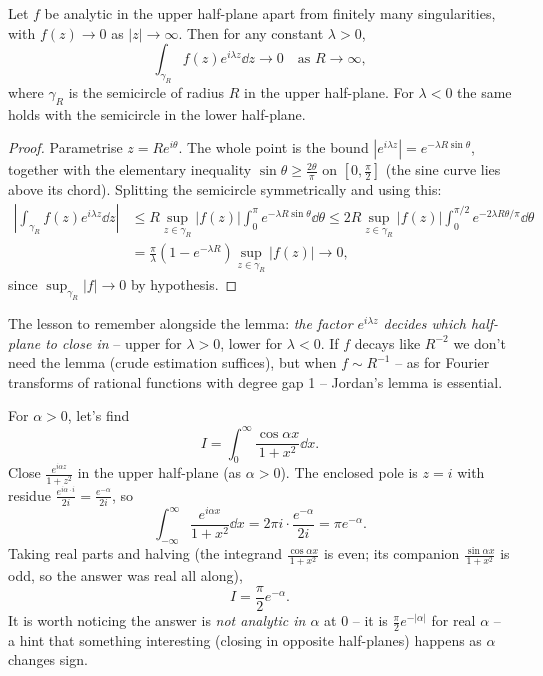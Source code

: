 \begin{lemma}
	Let $f$ be analytic in the upper half-plane apart from finitely many singularities, with $f(z) \to 0$ as $|z| \to \infty$. Then for any constant $\lambda > 0$,
	$$
	\int_{\gamma_R} f(z) e^{i\lambda z} \dd z \to 0 \quad \text{as } R \to \infty,
	$$
	where $\gamma_R$ is the semicircle of radius $R$ in the upper half-plane. For $\lambda < 0$ the same holds with the semicircle in the lower half-plane.
\end{lemma}
\begin{proof}
	Parametrise $z = Re^{i\theta}$. The whole point is the bound $|e^{i\lambda z}| = e^{-\lambda R \sin\theta}$, together with the elementary inequality $\sin\theta \geq \frac{2\theta}{\pi}$ on $[0, \frac{\pi}{2}]$ (the sine curve lies above its chord). Splitting the semicircle symmetrically and using this:
	\begin{align*}
		\left|\int_{\gamma_R} f(z) e^{i\lambda z} \dd z\right|
		&\leq R \sup_{z \in \gamma_R}|f(z)| \int_0^\pi e^{-\lambda R \sin\theta} \dd\theta
		\leq 2R \sup_{z \in \gamma_R}|f(z)| \int_0^{\pi/2} e^{-2\lambda R\theta/\pi} \dd \theta \\
		&= \frac{\pi}{\lambda}\left(1 - e^{-\lambda R}\right) \sup_{z \in \gamma_R} |f(z)| \to 0,
	\end{align*}
	since $\sup_{\gamma_R} |f| \to 0$ by hypothesis.
\end{proof}

The lesson to remember alongside the lemma: \emph{the factor $e^{i\lambda z}$ decides which half-plane to close in} -- upper for $\lambda > 0$, lower for $\lambda < 0$. If $f$ decays like $R^{-2}$ we don't need the lemma (crude estimation suffices), but when $f \sim R^{-1}$ -- as for Fourier transforms of rational functions with degree gap 1 -- Jordan's lemma is essential.

\begin{example}
	For $\alpha > 0$, let's find
	$$
	I = \int_0^\infty \frac{\cos \alpha x}{1 + x^2} \dd x.
	$$
	Close $\frac{e^{i\alpha z}}{1 + z^2}$ in the upper half-plane (as $\alpha > 0$). The enclosed pole is $z = i$ with residue $\frac{e^{i\alpha \cdot i}}{2i} = \frac{e^{-\alpha}}{2i}$, so
	$$
	\int_{-\infty}^\infty \frac{e^{i\alpha x}}{1 + x^2} \dd x = 2\pi i \cdot \frac{e^{-\alpha}}{2i} = \pi e^{-\alpha}.
	$$
	Taking real parts and halving (the integrand $\frac{\cos \alpha x}{1+x^2}$ is even; its companion $\frac{\sin \alpha x}{1 + x^2}$ is odd, so the answer was real all along),
	$$
	I = \frac{\pi}{2} e^{-\alpha}.
	$$
	It is worth noticing the answer is \emph{not analytic in $\alpha$} at $0$ -- it is $\frac{\pi}{2}e^{-|\alpha|}$ for real $\alpha$ -- a hint that something interesting (closing in opposite half-planes) happens as $\alpha$ changes sign.
\end{example}

